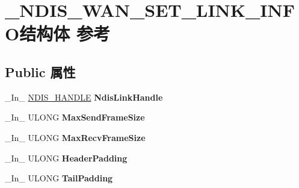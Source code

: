 \hypertarget{struct___n_d_i_s___w_a_n___s_e_t___l_i_n_k___i_n_f_o}{}\section{\+\_\+\+N\+D\+I\+S\+\_\+\+W\+A\+N\+\_\+\+S\+E\+T\+\_\+\+L\+I\+N\+K\+\_\+\+I\+N\+F\+O结构体 参考}
\label{struct___n_d_i_s___w_a_n___s_e_t___l_i_n_k___i_n_f_o}
\subsection*{Public 属性}
\begin{DoxyCompactItemize}
\item 
\mbox{\label{struct___n_d_i_s___w_a_n___s_e_t___l_i_n_k___i_n_f_o_ac7553d7dc553c2cf810ff00551aae77e}} 
\+\_\+\+In\+\_\+ \hyperlink{interfacevoid}{N\+D\+I\+S\+\_\+\+H\+A\+N\+D\+LE} {\bfseries Ndis\+Link\+Handle}
\item 
\mbox{\label{struct___n_d_i_s___w_a_n___s_e_t___l_i_n_k___i_n_f_o_a00a3798b0512b569ebd51335a915caef}} 
\+\_\+\+In\+\_\+ U\+L\+O\+NG {\bfseries Max\+Send\+Frame\+Size}
\item 
\mbox{\label{struct___n_d_i_s___w_a_n___s_e_t___l_i_n_k___i_n_f_o_a8bdc84036e62e3f410e9dfb5811d1c5e}} 
\+\_\+\+In\+\_\+ U\+L\+O\+NG {\bfseries Max\+Recv\+Frame\+Size}
\item 
\mbox{\label{struct___n_d_i_s___w_a_n___s_e_t___l_i_n_k___i_n_f_o_af65b2dc595d1999c17b749207ead82d9}} 
\+\_\+\+In\+\_\+ U\+L\+O\+NG {\bfseries Header\+Padding}
\item 
\mbox{\label{struct___n_d_i_s___w_a_n___s_e_t___l_i_n_k___i_n_f_o_ad8b208c6755687f29335095dab9a806a}} 
\+\_\+\+In\+\_\+ U\+L\+O\+NG {\bfseries Tail\+Padding}
\item 
\mbox{\label{struct___n_d_i_s___w_a_n___s_e_t___l_i_n_k___i_n_f_o_a0fb2df96b7fb1cbc363c29a0bd395a5b}} 

\end{DoxyCompactItemize}
